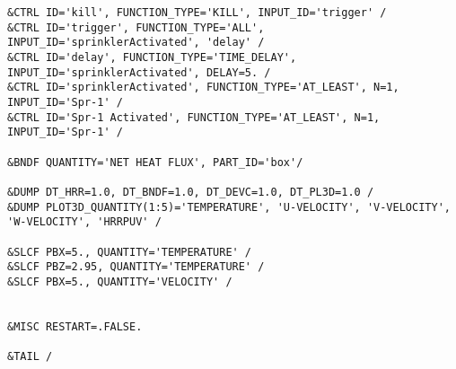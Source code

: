 \begin{lstlisting}[emptylines=0,basicstyle=\tiny]
&CTRL ID='kill', FUNCTION_TYPE='KILL', INPUT_ID='trigger' /
&CTRL ID='trigger', FUNCTION_TYPE='ALL', INPUT_ID='sprinklerActivated', 'delay' /
&CTRL ID='delay', FUNCTION_TYPE='TIME_DELAY', INPUT_ID='sprinklerActivated', DELAY=5. /
&CTRL ID='sprinklerActivated', FUNCTION_TYPE='AT_LEAST', N=1, INPUT_ID='Spr-1' /
&CTRL ID='Spr-1 Activated', FUNCTION_TYPE='AT_LEAST', N=1, INPUT_ID='Spr-1' /

&BNDF QUANTITY='NET HEAT FLUX', PART_ID='box'/

&DUMP DT_HRR=1.0, DT_BNDF=1.0, DT_DEVC=1.0, DT_PL3D=1.0 /
&DUMP PLOT3D_QUANTITY(1:5)='TEMPERATURE', 'U-VELOCITY', 'V-VELOCITY', 'W-VELOCITY', 'HRRPUV' /

&SLCF PBX=5., QUANTITY='TEMPERATURE' /
&SLCF PBZ=2.95, QUANTITY='TEMPERATURE' /
&SLCF PBX=5., QUANTITY='VELOCITY' /


&MISC RESTART=.FALSE.

&TAIL /


\end{lstlisting}

